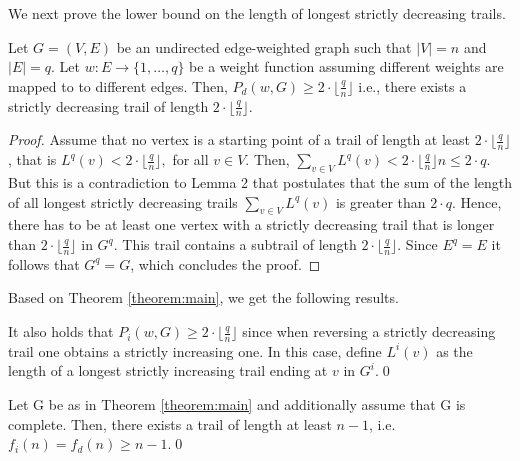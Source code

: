\begin{isabellebody}
\begin{isamarkuptext}
\noindent We next prove the lower bound on the length of longest strictly decreasing trails.

\begin{theorem}Let $G = (V,E)$ be an undirected edge-weighted graph such that $|V|=n$ and $|E| = q$. Let  
$w:E\rightarrow \{1,\ldots,q\}$ be a weight function assuming different weights are mapped to to different edges. 
Then, $P_d(w,G) \ge 2\cdot\lfloor\frac{q}{n}\rfloor$ i.e., there 
exists a strictly decreasing trail of length $2\cdot\lfloor\frac{q}{n}\rfloor$.\label{theorem:main}\end{theorem}

\begin{proof}Assume that no vertex is a starting point of a trail of length at least $2\cdot\lfloor\frac{q}{n}\rfloor$, that is
	$L^{q}(v) < 2\cdot\lfloor\frac{q}{n}\rfloor,$ for all $v \in V$. 
	Then, $\sum_{v\in V} L^{q}(v) < 2\cdot\lfloor\frac{q}{n}\rfloor n \le 2\cdot q$. But this is a contradiction 
	to Lemma 2 that postulates that the sum of the length of all longest strictly decreasing trails $\sum_{v\in V} L^{q}(v)$ is greater than $2\cdot q$.
	Hence, there has to be at least one vertex with a strictly decreasing trail that is longer than $2\cdot\lfloor\frac{q}{n}\rfloor$ in $G^q$.
	This trail contains a subtrail of length $2\cdot\lfloor\frac{q}{n}\rfloor$. Since $E^q=E$ it follows that $G^q=G$, which concludes 
	the proof. 
\end{proof} 

\noindent Based on Theorem \ref{theorem:main}, we get the following results.

\begin{corollary}\label{corollary:IncreasingIsDecreasing}
It also holds that $P_i(w,G) \ge 2\cdot\lfloor\frac{q}{n}\rfloor$ since when reversing a strictly decreasing trail 
one obtains a strictly increasing one. In this case, define $L^i(v)$ as the 
length of a longest strictly increasing trail ending at $v$ in $G^i$.\qed \end{corollary}

\begin{corollary}
Let G be as in Theorem \ref{theorem:main} and additionally assume that G is complete. Then, there exists a trail 
of length at least $n-1$, i.e. $f_i(n) = f_d(n)  \ge n-1$.\qed
\end{corollary}


\end{isamarkuptext}
\end{isabellebody}
